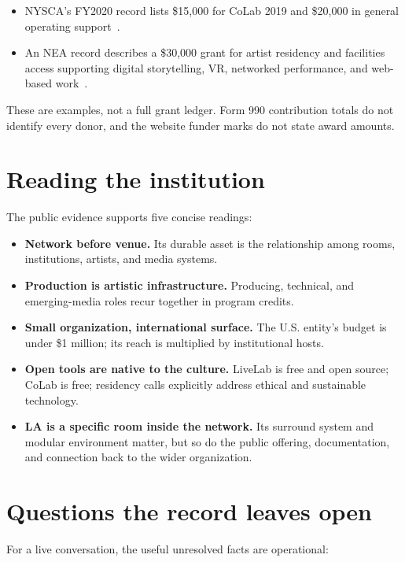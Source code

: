 \documentclass[10pt,letterpaper,twocolumn]{article}
\begin{document}
\begin{itemize}
\item NYSCA's FY2020 record lists \$15,000 for CoLab 2019 and \$20,000 in general operating support~\citep{nysca2020}.
\item An NEA record describes a \$30,000 grant for artist residency and facilities access supporting digital storytelling, VR, networked performance, and web-based work~\citep{nea2023}.
\end{itemize}

These are examples, not a full grant ledger. Form 990 contribution totals do not identify every donor, and the website funder marks do not state award amounts.

\section{Reading the institution}

The public evidence supports five concise readings:

\begin{itemize}
\item \textbf{Network before venue.} Its durable asset is the relationship among rooms, institutions, artists, and media systems.
\item \textbf{Production is artistic infrastructure.} Producing, technical, and emerging-media roles recur together in program credits.
\item \textbf{Small organization, international surface.} The U.S. entity's budget is under \$1 million; its reach is multiplied by institutional hosts.
\item \textbf{Open tools are native to the culture.} LiveLab is free and open source; CoLab is free; residency calls explicitly address ethical and sustainable technology.
\item \textbf{LA is a specific room inside the network.} Its surround system and modular environment matter, but so do the public offering, documentation, and connection back to the wider organization.
\end{itemize}

\section{Questions the record leaves open}

For a live conversation, the useful unresolved facts are operational:
\end{document}
